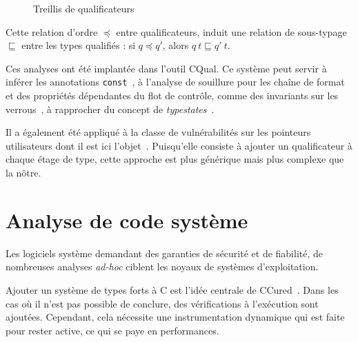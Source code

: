 \begin{figure}
\centering
{}

\caption{Treillis de qualificateurs}
\label{fig:cqual-treillis}
\end{figure}

Cette relation d'ordre $\preceq$ entre qualificateurs, induit une relation de
sous-typage $\sqsubseteq$ entre les types qualifiés : si $q \preceq q'$, alors
$q~t \sqsubseteq q'~t$.

Ces analyses ont été implantée dans l'outil CQual. Ce système peut servir à
inférer les annotations \texttt{const}~\cite{pldi99}, à l'analyse de souillure
pour les chaîne de format~\cite{usenix01} %
et des propriétés dépendantes du flot de contrôle, comme des invariants sur les
verrous~\cite{pldi02}, à rapprocher du concept de
\emph{typestates}~\cite{tse12-typestate}.

Il a également été appliqué à la classe de vulnérabilités sur les pointeurs
utilisateurs dont il est ici l'objet~\cite{cquk-usenix04}. Puisqu'elle consiste
à ajouter un qualificateur à chaque étage de type, cette approche est plus
générique mais plus complexe que la nôtre. %


\section{Analyse de code système}

Les logiciels système demandant des garanties de sécurité et de fiabilité, de
nombreuses analyses \emph{ad-hoc} ciblent les noyaux de systèmes d'exploitation.

Ajouter un système de types forts à C est l'idée centrale de
CCured~\cite{ccured-toplas}. Dans les cas où il n'est pas possible de conclure,
des vérifications à l'exécution sont ajoutées. Cependant, cela nécessite une
instrumentation dynamique qui est faite pour rester active, ce qui se paye en
performances.

